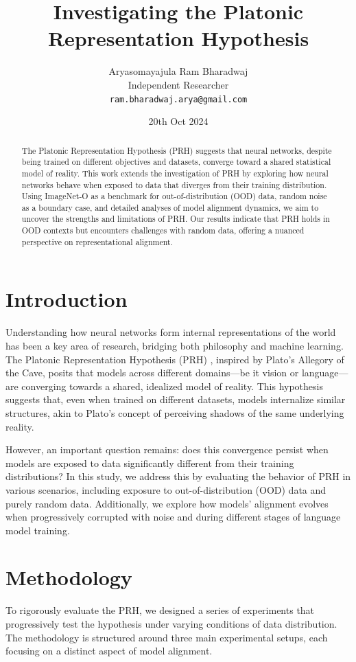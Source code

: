 \documentclass[10pt,a4paper]{article}
\title{Investigating the Platonic Representation Hypothesis}
\author{Aryasomayajula Ram Bharadwaj\\
Independent Researcher\\
\texttt{ram.bharadwaj.arya@gmail.com}}
\date{20th Oct 2024}
\begin{document}
\maketitle

\begin{abstract}
The Platonic Representation Hypothesis (PRH) \cite{huh2024prh} suggests that neural networks, despite being trained on different objectives and datasets, converge toward a shared statistical model of reality. This work extends the investigation of PRH by exploring how neural networks behave when exposed to data that diverges from their training distribution. Using ImageNet-O as a benchmark for out-of-distribution (OOD) data, random noise as a boundary case, and detailed analyses of model alignment dynamics, we aim to uncover the strengths and limitations of PRH. Our results indicate that PRH holds in OOD contexts but encounters challenges with random data, offering a nuanced perspective on representational alignment.
\end{abstract}

\section{Introduction}
Understanding how neural networks form internal representations of the world has been a key area of research, bridging both philosophy and machine learning. The Platonic Representation Hypothesis (PRH) \cite{huh2024prh}, inspired by Plato’s Allegory of the Cave, posits that models across different domains—be it vision or language—are converging towards a shared, idealized model of reality. This hypothesis suggests that, even when trained on different datasets, models internalize similar structures, akin to Plato’s concept of perceiving shadows of the same underlying reality.

However, an important question remains: does this convergence persist when models are exposed to data significantly different from their training distributions? In this study, we address this by evaluating the behavior of PRH in various scenarios, including exposure to out-of-distribution (OOD) data and purely random data. Additionally, we explore how models' alignment evolves when progressively corrupted with noise and during different stages of language model training.



\section{Methodology}
To rigorously evaluate the PRH, we designed a series of experiments that progressively test the hypothesis under varying conditions of data distribution. The methodology is structured around three main experimental setups, each focusing on a distinct aspect of model alignment.
\end{document}
